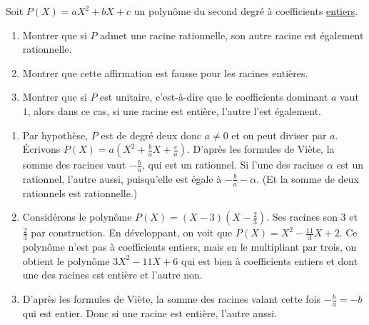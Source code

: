 \begin{exo}
Soit $P(X) = aX^2+bX+c$ un polynôme  du second degré à coefficients \underline{entiers}.
\begin{enumerate}
\item Montrer que si $P$ admet une racine rationnelle, son autre racine est également rationnelle.
\item Montrer que cette affirmation est fausse pour les racines entières.
\item Montrer que si $P$ est unitaire, c'est-à-dire que le coefficients dominant $a$ vaut $1$, alors dans ce cas, si une racine est entière, l'autre l'est également.
\end{enumerate}
\begin{sol}
\begin{enumerate}
\item Par hypothèse, $P$ est de degré deux donc $a\neq 0$ et on peut diviser par $a$. Écrivons $P(X) = a\left(X^2+\frac{b}{a}X+\frac{c}{a}\right)$. D'après les formules de Viète, la somme des racines vaut $-\frac{b}{a}$, qui est un rationnel. Si l'une des racines $\alpha$ est un rationnel, l'autre aussi, puisqu'elle est égale à $-\frac{b}{a}-\alpha$. (Et la somme de deux rationnels est rationnelle.)
\item Considérons le polynôme $P(X)=(X-3)(X-\frac23)$. Ses racines son $3$ et $\frac23$ par construction. En développant, on voit que $P(X) = X^2-\frac{11}{3}X+2$. Ce polynôme n'est pas à coefficients entiers, mais en le multipliant par trois, on obtient le polynôme $3X^2-11X+6$  qui est bien à coefficients entiers et dont une des racines est entière et l'autre non.
\item D'après les formules de Viète, la somme des racines valant cette fois $-\frac{b}{a}=-b$ qui est entier. Donc si une racine est entière, l'autre aussi.
\end{enumerate}
\end{sol}
\end{exo}

